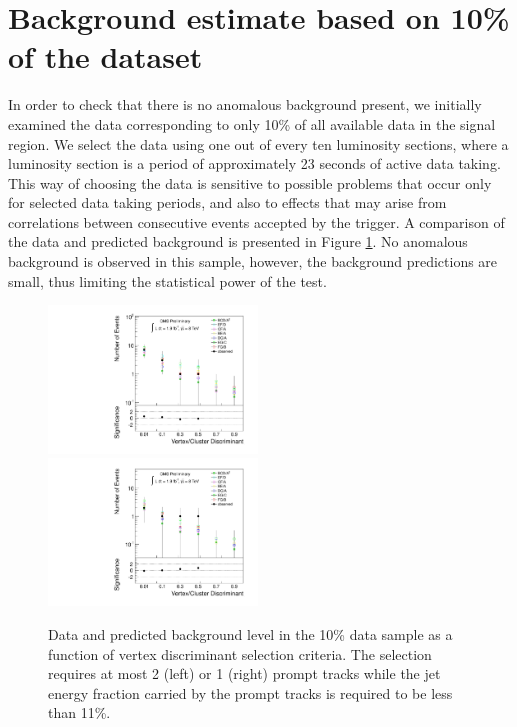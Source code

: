 \section{Background estimate based on 10\% of the dataset}
\label{sec:partunblinding}

In order to check that there is no anomalous background present,
 we initially examined the data corresponding to only 10\% of all available 
data in the signal region.  
We select the data using one out of every ten luminosity sections, where a luminosity
section is a period of approximately 23 seconds of active data taking. This way of choosing the data is sensitive to possible problems that occur only for selected data taking periods, and also to effects that may arise from
correlations between consecutive events accepted by the trigger. A comparison of the data and predicted
background is presented in Figure \ref{fig:10percent}. No anomalous background is observed in this sample,
however, the background predictions are small, thus limiting the statistical
power of the test.

\begin{figure}[htbp]
  \centering
  \includegraphics[width=0.495\textwidth]{plots/background/tenpercent1.pdf}
  \includegraphics[width=0.495\textwidth]{plots/background/tenpercent2.pdf}
  \caption{Data and predicted background level in the 10\% data sample as a function of vertex discriminant
selection criteria. The selection requires at most 2 (left) or 1 (right) prompt tracks while the jet energy 
fraction carried by the prompt tracks is required to be less than 11\%. \label{fig:10percent}}
\end{figure}  


